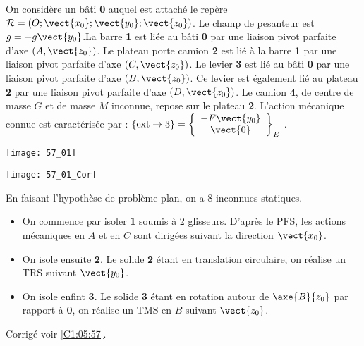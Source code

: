 \normalfalse \difficiletrue \tdifficilefalse
\correctiontrue


\setcounter{question}{0}
\ifcorrection
\else
{}
\fi

\ifprof
\else
On considère un bâti \textbf{0} auquel est attaché le repère$\mathcal{R}=\left(O;\vect{x_0};\vect{y_0};\vect{z_0} \right)$. Le champ de pesanteur est $g=-g\vect{y_0}$.La barre \textbf{1} est liée au bâti \textbf{0} par une liaison pivot parfaite d’axe $\left(A,\vect{z_0}\right)$. Le plateau porte camion \textbf{2} est lié à la barre \textbf{1} par une liaison pivot parfaite d’axe $\left(C,\vect{z_0}\right)$. Le levier \textbf{3} est lié au bâti \textbf{0} par une liaison pivot parfaite d’axe $\left(B,\vect{z_0}\right)$. Ce levier est également lié au plateau \textbf{2} par une liaison pivot parfaite d’axe $\left(D,\vect{z_0}\right)$. Le camion \textbf{4}, de centre de masse $G$ et de masse $M$ inconnue, repose sur le plateau \textbf{2}.
L’action mécanique connue est caractérisée par : $\{\text{ext}\rightarrow 3\}=\left\{
\begin{array}{c}
-F\vect{y_0} \\
\vect{0} \\
\end{array}
\right\}_E$ .


\begin{center}
\texttt{[image: 57\_01]}
\end{center}


\fi

\ifprof

\begin{center}
\texttt{[image: 57\_01\_Cor]}
\end{center}

En faisant l'hypothèse de problème plan, on a 8 inconnues statiques. 
\else
\fi



\ifprof
\begin{itemize}
\item On commence par isoler \textbf{1} soumis à 2 glisseurs. D'après le PFS, les actions mécaniques en $A$ et en $C$ sont dirigées suivant la direction $\vect{x_0}$.
\item On isole ensuite \textbf{2}. Le solide \textbf{2} étant en translation circulaire, on réalise un TRS suivant $\vect{y_0}$. 
\item On isole enfint \textbf{3}. Le solide \textbf{3} étant en rotation autour de $\axe{B}{z_0}$ par rapport à \textbf{0},  on réalise un TMS en $B$ suivant $\vect{z_0}$. 
\end{itemize}
\else
\fi
\ifprof
\else
\begin{flushright}
\footnotesize{Corrigé  voir \ref{C1:05:57}.}
\end{flushright}%
\fi